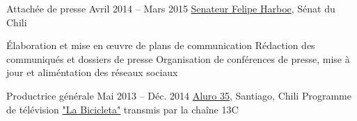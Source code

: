 \begin{joblist}
{		%
	}



\item[Attachée de presse]{Avril 2014 -- Mars 2015}
     {
     \href{https://www.harboe.cl/}{Senateur Felipe Harboe}, Sénat du Chili
     } 
	 {
                
		\iftbftiny \vspace{-0.5cm} \fi
			\begin{itemize}
			  \iftbftiny \setlength\itemsep{-3pt} \fi
			  \cvitem[\checkmark] Élaboration et mise en œuvre de plans de communication
			  \cvitem[\checkmark] Rédaction des communiqués et dossiers de presse
			  \cvitem[\checkmark] Organisation de conférences de presse, mise à jour et aliméntation des réseaux sociaux
			\end{itemize}     
			
	}
    
    
    
\item[Productrice générale]{Mai 2013 -- Déc. 2014}
     {
     \href{https://www.aluro35.com/}{Aluro 35}, Santiago, Chili
     }
     {Programme de télévision \href{http://www.13.cl/c/programas/la-bicicleta}{"La Bicicleta"} transmis par la chaîne 13C \\
			
}
\end{joblist}
